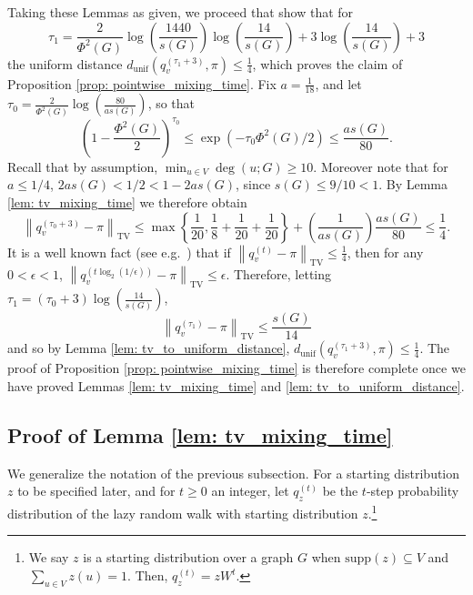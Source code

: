 \documentclass[11pt,twoside]{article}
\newcommand{\set}[1]{\left\{#1\right\}}
\newcommand{\norm}[1]{\left\lVert#1\right\rVert}
\newcommand{\1}{\mathbf{1}}
\begin{document}
\noindent Taking these Lemmas as given, we proceed that show that for
\begin{equation*}
\tau_1 = \frac{2}{\Phi^2(G)} \log \left(\frac{1440}{s(G)}\right)\log \left(\frac{14}{s(G)}\right)  + 3 \log \left(\frac{14}{s(G)}\right) + 3
\end{equation*}
the uniform distance $d_{\textrm{unif}}(q_v^{(\tau_1 + 3)}, \pi) \leq \frac{1}{4}$, which proves the claim of Proposition \ref{prop: pointwise_mixing_time}. Fix $a = \frac{1}{18}$, and let $\tau_0 = \frac{2}{\Phi^2(G)} \log \left(\frac{80}{a s(G)}\right)$, so that
\begin{equation*}
\left(1 - \frac{\Phi^2(G)}{2}\right)^{\tau_0} \leq \exp(- \tau_0\Phi^2(G)/2) \leq \frac{as(G)}{80}.
\end{equation*}
Recall that by assumption, $\min_{u \in V} \deg(u;G) \geq 10$. Moreover note that for $a \leq 1/4$, $2as(G) < 1/2 < 1 - 2as(G)$, since $s(G) \leq 9/10 < 1$. By Lemma \ref{lem: tv_mixing_time} we therefore obtain
\begin{equation*}
\norm{q_v^{(\tau_0 + 3)} - \pi}_{\mathrm{TV}} \leq \max \set{\frac{1}{20}, \frac{1}{8} + \frac{1}{20} + \frac{1}{20}} + \left(\frac{1}{as(G)}\right) \frac{as(G)}{80} \leq \frac{1}{4}.
\end{equation*}
It is a well known fact (see e.g.~\cite{montenegro2002}) that if $\norm{q_v^{(t)} - \pi}_{\mathrm{TV}} \leq \frac{1}{4}$, then for any $0 < \epsilon < 1$, $\norm{q_v^{(t\log_2(1/\epsilon))} - \pi}_{\mathrm{TV}} \leq \epsilon$. Therefore, letting $\tau_1 = (\tau_0 + 3) \log(\frac{14}{s(G)})$, 
\begin{equation*}
\norm{q_v^{(\tau_1)} - \pi}_{\mathrm{TV}} \leq \frac{s(G)}{14}
\end{equation*}
and so by Lemma \ref{lem: tv_to_uniform_distance}, $d_{\textrm{unif}}(q_v^{(\tau_1 + 3)}, \pi) \leq \frac{1}{4}$. The proof of Proposition \ref{prop: pointwise_mixing_time} is therefore complete once we have proved Lemmas \ref{lem: tv_mixing_time} and \ref{lem: tv_to_uniform_distance}.


\subsection{Proof of Lemma \ref{lem: tv_mixing_time}}
\label{sec: mixing_time_on_graphs}

We generalize the notation of the previous subsection. For a starting distribution $z$ to be specified later, and for $t \geq 0$ an integer, let $q_z^{(t)}$ be the $t$-step probability distribution of the lazy random walk with starting distribution $z$.\footnote{We say $z$ is a starting distribution over a graph $G$ when $\textrm{supp}(z) \subseteq V$ and $\sum_{u \in V}z(u) = 1$. Then, $q_z^{(t)} = zW^t$.}
\end{document}
